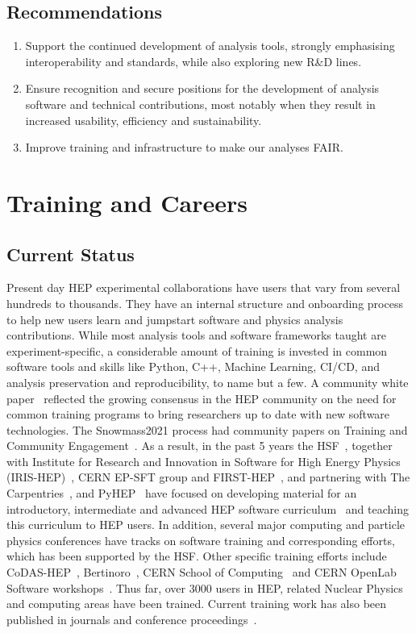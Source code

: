 \documentclass[10pt,a4paper]{article}
\begin{document}
\subsection{Recommendations}\label{recommendations-3}

\begin{enumerate}
\def\labelenumi{\arabic{enumi}.}
\item
  Support the continued development of analysis tools, strongly
  emphasising interoperability and standards, while also exploring new
  R\&D lines.
\item
  Ensure recognition and secure positions for the development of
  analysis software and technical contributions, most notably when they
  result in increased usability, efficiency and sustainability.
\item
  Improve training and infrastructure to make our analyses FAIR.
\end{enumerate}

\section{Training and Careers}\label{training-and-careers}

\subsection{Current Status}\label{current-status}

Present day HEP experimental collaborations have users that vary from several
hundreds to thousands. They have an internal structure and onboarding process to
help new users learn and jumpstart software and physics analysis contributions.
While most analysis tools and software frameworks taught are
experiment-specific, a considerable amount of training is invested in common
software tools and skills like Python, C++, Machine Learning, CI/CD, and
analysis preservation and reproducibility, to name but a few. A community white
paper~\cite{T4} reflected the growing consensus in the HEP community on the need
for common training programs to bring researchers up to date with new software
technologies. The Snowmass2021 process had community papers on Training and
Community Engagement~\cite{5-7}. As a result, in the past 5 years the
HSF~\cite{8}, together with Institute for Research and Innovation in Software
for High Energy Physics (IRIS-HEP)~\cite{9}, CERN EP-SFT group and
FIRST-HEP~\cite{10}, and partnering with The Carpentries~\cite{11}, and
PyHEP~\cite{13} have focused on developing material for an introductory,
intermediate and advanced HEP software curriculum~\cite{14} and teaching this
curriculum to HEP users. In addition, several major computing and particle
physics conferences have tracks on software training and corresponding efforts,
which has been supported by the HSF. Other specific training efforts include
CoDAS-HEP~\cite{15}, Bertinoro~\cite{16}, CERN School of Computing~\cite{17} and
CERN OpenLab Software workshops~\cite{18}. Thus far, over 3000 users in HEP,
related Nuclear Physics and computing areas have been trained. Current training
work has also been published in journals and conference proceedings~\cite{19-21}.
\end{document}
